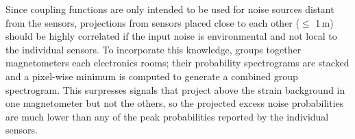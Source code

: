 Since coupling functions are only intended to be used for noise sources distant from the sensors, projections from sensors placed close to each other ($\leqslant$ 1\,m) should be highly correlated if the input noise is environmental and not local to the individual sensors.
To incorporate this knowledge,  groups together magnetometers each electronics rooms; their probability spectrograms are stacked and a pixel-wise minimum is computed to generate a combined group spectrogram.
This surpresses signals that project above the strain background in one magnetometer but not the others, so the projected excess noise probabilities are much lower than any of the peak probabilities reported by the individual sensors.

